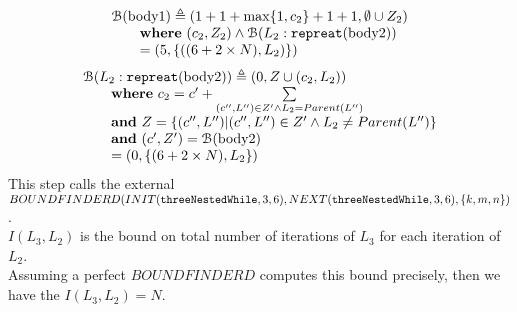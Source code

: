 \begin{enumerate}
\[
  \begin{array}{l}
    \mathcal{B}(\text{body1} )  \triangleq (1 + 1 + \max\{1, c_2\} + 1 + 1, \emptyset \cup Z_2) 
    \\ \qquad
    \textbf{where} ~ (c_2, Z_2) \land \mathcal{B}(L_2 : \mathtt{repreat}(\text{body2}))
    \\ \qquad = (5, \{( (6 + 2 \times N), L_2)\})
\end{array}
\]
\[
  \begin{array}{l}
    \mathcal{B}(L_2: \mathtt{repreat}(\text{body2}))  \triangleq (0, Z \cup (c_2, L_2)) \\ \qquad
    \textbf{where} ~ c_2 = c' + \sum\limits_{(c'', L'') \in Z' \land L_2 = Parent(L'')}
    \\ \qquad
    \textbf{and} ~
    Z = \{(c'', L'') | (c'', L'') \in Z' \land L_2 \neq Parent(L'')\}
    \\
    \qquad
    \textbf{and} ~ (c', Z') = \mathcal{B}(\text{body2})
    \\ \qquad = (0, \{(6 + 2 \times N), L_2\})
\end{array}
\]
This step calls the external 
\\
$BOUNDFINDERD(INIT(\mathtt{threeNestedWhile}, 3, 6), NEXT(\mathtt{threeNestedWhile}, 3, 6), \{k, m, n\})$.
\\
$I(L_3, L_2)$ is the bound on total number of iterations of $L_3$ for each iteration of $L_2$.
\\
Assuming a perfect $BOUNDFINDERD$ computes this bound precisely, then we have the $I(L_3, L_2) = N$.


\end{enumerate}
